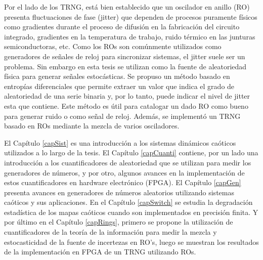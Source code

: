 Por el lado de los TRNG, está bien establecido que un oscilador en anillo (RO) presenta fluctuaciones de fase (jitter) que dependen de procesos puramente físicos como gradientes durante el proceso de difusión en la fabricación del circuito integrado, gradientes en la temperatura de trabajo, ruido térmico en las junturas semiconductoras, etc.
Como los ROs son comúnmente utilizados como generadores de señales de reloj para sincronizar sistemas, el jitter suele ser un problema.
Sin embargo en esta tesis se utilizan como la fuente de aleatoriedad física para generar señales estocásticas.
Se propuso un método basado en entropías diferenciales que permite extraer un valor que indica el grado de aleatoriedad de una serie binaria y, por lo tanto, puede indicar el nivel de jitter esta que contiene.
Este método es útil para catalogar un dado RO como bueno para generar ruido o como señal de reloj.
Además, se implementó un TRNG basado en ROs mediante la mezcla de varios osciladores.

El Capítulo \ref{capSist} es una introducción a los sistemas dinámicos caóticos utilizados a lo largo de la tesis.
El Capítulo \ref{capCuanti} contiene, por un lado una introducción a los cuantificadores de aleatoriedad que se utilizan para medir los generadores de números, y por otro, algunos avances en la implementación de estos cuantificadores en hardware electrónico (FPGA).
El Capítulo \ref{capGen} presenta avances en generadores de números aleatorios utilizando sistemas caóticos y sus aplicaciones.
En el Capítulo \ref{capSwitch} se estudia la degradación estadística de los mapas caóticos cuando son implementados en precisión finita.
Y por último en el Capítulo \ref{capRings}, primero se propone la utilización de cuantificadores de la teoría de la información para medir la mezcla y estocasticidad de la fuente de incertezas en RO's, luego se muestran los resultados de la implementación en FPGA de un TRNG utilizando ROs.